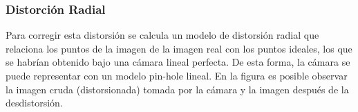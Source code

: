 \begin{frame}
    \frametitle{Distorción Radial}
    
    Para corregir esta distorsión se calcula un modelo de distorsión radial que relaciona los puntos de la imagen de la imagen real con los puntos ideales, los que se habrían obtenido bajo una cámara lineal perfecta. De esta forma, la cámara se puede representar con un modelo pin-hole lineal. En la figura es posible observar la imagen cruda (distorsionada) tomada por la cámara y la imagen después de la desdistorsión.
    
    \begin{figure}[!h]
        \centering
    \end{figure}
    
\end{frame}


    
    
    
